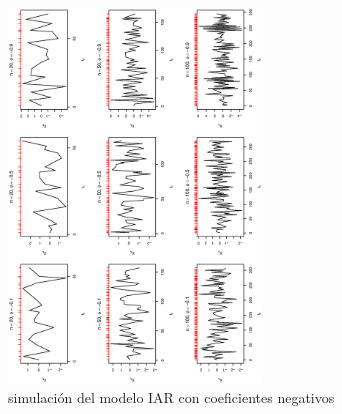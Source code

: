 \begin{figure}[h]
    \includegraphics[width=0.6\textwidth, angle = 270]{Kap3/Fig_Cap3/sim2.eps}
    \caption{simulación del modelo IAR con coeficientes negativos}
    \label{fig:sim2}
\end{figure}